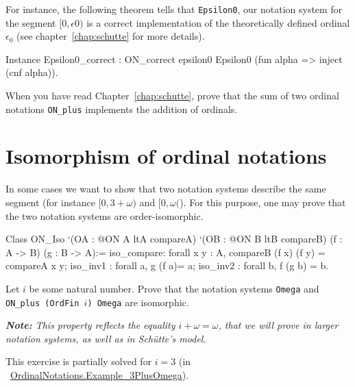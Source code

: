 \documentclass[a4paper]{book}
\begin{document}
For instance, the following theorem tells that \texttt{Epsilon0}, our notation system for the segment $[0,\epsilon0)$ is a correct implementation of the theoretically defined  ordinal $\epsilon_0$
(see chapter~\ref{chap:schutte} for more details).


\begin{Coqsrc}
Instance Epsilon0_correct :
  ON_correct epsilon0 Epsilon0  (fun alpha => inject (cnf alpha)).
\end{Coqsrc}


\begin{project}
  When you have read Chapter~\ref{chap:schutte}, prove that the sum of two ordinal notations \texttt{ON\_plus} implements the addition of ordinals.
\end{project}





\section{Isomorphism of ordinal notations}


In some cases we want to show that two notation systems describe the same segment (for instance $[0,3+\omega)$ and $[0,\omega($\;). For this purpose, one may prove that the two notation systems are order-isomorphic.

\label{types:ON-iso} 
\begin{Coqsrc}
Class  ON_Iso 
       `(OA : @ON A ltA compareA)
       `(OB : @ON B ltB  compareB)
       (f : A -> B)
       (g : B -> A):=
  {
  iso_compare: forall x y : A, 
      compareB (f x) (f y) = compareA x y;
  iso_inv1 : forall a, g (f a)= a;
  iso_inv2 : forall b, f (g b) = b}.
\end{Coqsrc}


\begin{exercise}
Let $i$ be some natural number. Prove that the notation systems 
\texttt{Omega} and \texttt{ON\_plus (OrdFin $i$) Omega} are isomorphic.

{\it \textbf{Note:} This property reflects the equality $i+\omega=\omega$, that we will prove in larger notation systems, as well as in Schütte's model.}

This exercise is partially solved for $i=3$ (in ~\href{../src/html/hydras.OrdinalNotations.Example_3PlusOmega.html}{OrdinalNotations.Example\_3PlusOmega}).

\end{exercise}
\end{document}
